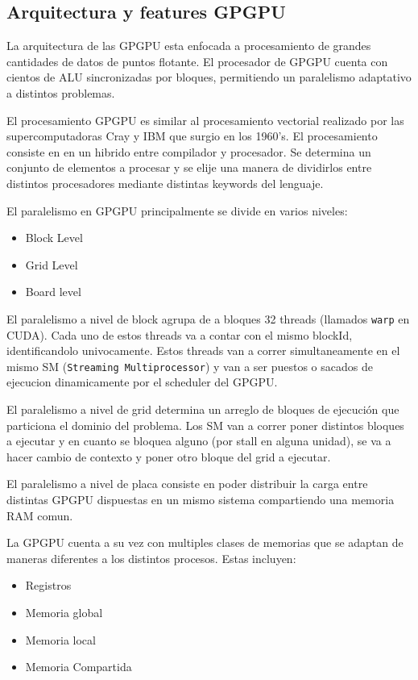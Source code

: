 \subsection{Arquitectura y features GPGPU}

La arquitectura de las GPGPU esta enfocada a procesamiento de grandes cantidades de datos
de puntos flotante. El procesador de GPGPU cuenta con cientos de ALU sincronizadas
por bloques, permitiendo un paralelismo adaptativo a distintos problemas.

El procesamiento GPGPU es similar al procesamiento vectorial
realizado por las supercomputadoras Cray y IBM que surgio en los 1960's.
El procesamiento consiste en en un hibrido entre compilador y procesador. Se determina
un conjunto de elementos a procesar y se elije una manera de dividirlos entre distintos
procesadores mediante distintas keywords del lenguaje.

El paralelismo en GPGPU principalmente se divide en varios niveles:
\begin{itemize}
  \item Block Level
  \item Grid Level
  \item Board level
\end{itemize}

El paralelismo a nivel de block agrupa de a bloques 32 threads (llamados \texttt{warp} en CUDA).
Cada uno de estos threads va a contar con el mismo blockId, identificandolo univocamente.
Estos threads van a correr simultaneamente en el mismo SM (\texttt{Streaming Multiprocessor}) y
van a ser puestos o sacados de ejecucion dinamicamente por el scheduler del GPGPU.

El paralelismo a nivel de grid determina un arreglo de bloques de ejecuci\'on que particiona
el dominio del problema. Los SM van a correr poner distintos bloques a ejecutar y en cuanto
se bloquea alguno (por stall en alguna unidad), se va a hacer cambio de contexto y poner
otro bloque del grid a ejecutar.

El paralelismo a nivel de placa consiste en poder distribuir la carga entre distintas
GPGPU dispuestas en un mismo sistema compartiendo una memoria RAM comun.

La GPGPU cuenta a su vez con multiples clases de memorias que se adaptan de maneras
diferentes a los distintos procesos. Estas incluyen:

\begin{itemize}
  \item Registros
  \item Memoria global
  \item Memoria local
  \item Memoria Compartida
\end{itemize}


